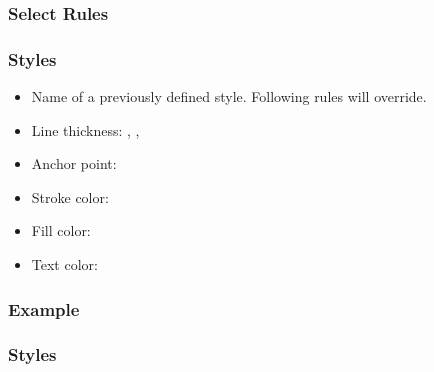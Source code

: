 \subsubsection{Select Rules}
\begin{frame}[fragile]
  \frametitle{Styles }
  \vspace{3mm}
  \begin{itemize}
    \item Name of a previously defined style. Following rules will override.
    \item Line thickness: , , 
    \item Anchor point: 
    \item Stroke color: 
    \item Fill color: 
    \item Text color: 
  \end{itemize}
\end{frame}

\subsubsection{Example}
\begin{frame}[fragile]
  \frametitle{Styles }
  \vspace{3mm}
  
\end{frame}

